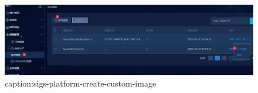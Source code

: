\begin{figure}[htbp]
	\centering
	\includegraphics[width=1\textwidth]{figures/sigs-platform-create-custom-image.png}
	\caption{caption:sigs-platform-create-custom-image}
	\label{fig:sigs-platform-create-custom-image}
\end{figure}